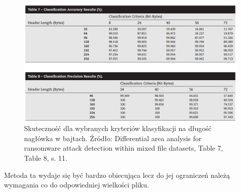 \begin{figure}[H]
    \centering
    \includegraphics[width=0.85\linewidth]{rysunki/wycinek.png}
    \caption{Skuteczność dla wybranych kryteriów klasyfikacji na długość nagłówka w bajtach. Źródło: Differential area analysis for ransomware
    attack detection within mixed file datasets, Table 7, Table 8, s. 11.}
    \label{fig:enter-label}
\end{figure}
Metoda ta wydaje się być bardzo obiecująca lecz do jej ograniczeń należą wymagania co do odpowiedniej wielkości pliku.
